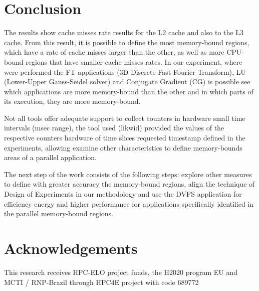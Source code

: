 \documentclass[conference,letter,10pt,final]{IEEEtran}
\begin{document}
\section{Conclusion}
\label{sec:orgheadline5}
\label{sec:conclusion}


The results show cache misses rate results for the L2 cache and also
to the L3 cache. From this result, it is possible to define the most
memory-bound regions, which have a rate of cache misses larger than
the other, as well as more CPU-bound regions that have smaller cache
misses rates. In our experiment, where were performed the FT
applications (3D Discrete Fast Fourier Transform), LU (Lower-Upper
Gauss-Seidel solver) and Conjugate Gradient (CG) is possible see which
applications are more memory-bound than the other and in which parts
of its execution, they are more memory-bound.

Not all tools offer adequate support to collect counters in hardware
small time intervals (msec range), the tool used (likwid) provided the
values of the respective counters hardware of time slices requested
timestamp defined in the experiments, allowing examine other
characteristics to define memory-bounds areas of a parallel
application. 

The next step of the work consists of the following steps: explore
other measures to define with greater accuracy the memory-bound
regions, align the technique of Design of Experiments in our
methodology and use the DVFS application for efficiency energy and
higher performance for applications specifically identified in the
parallel memory-bound regions. 


\section*{Acknowledgements}

This research receives HPC-ELO project funds, the H2020
program EU and MCTI / RNP-Brazil through HPC4E project
with code 689772




\end{document}
